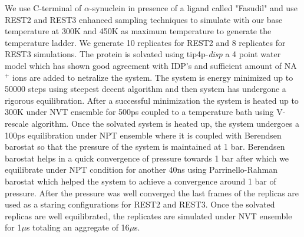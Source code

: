 We use C-terminal of $\alpha$-synuclein in presence of a ligand called "Fasudil" and use REST2 and REST3 enhanced sampling techniques to simulate with our base temperature at 300K 
and 450K as maximum temperature to generate the temperature ladder.
We generate 10 replicates for REST2 and 8 replicates for REST3 simulations.
The protein is solvated using tip4p-\textit{disp} a 4 point water model which has shown good agreement with IDP's and sufficient amount of NA$^{+}$ ions are added to netralize the 
system.
The system is energy minimized up to 50000 steps using steepest decent algorithm and then system has undergone a rigorous equilibration.
After a successful minimization the system is heated up to 300K under NVT ensemble for 500ps coupled to a temperature bath using V-rescale algorithm.
Once the solvated system is heated up, the system undergoes a 100ps equilibration under NPT ensemble where it is coupled with Berendsen barostat so that the pressure of the system 
is maintained at 1 bar.
Berendsen barostat helps in a quick convergence of pressure towards 1 bar after which we equilibrate under NPT condition for another 40ns using Parrinello-Rahman barostat which 
helped the system to achieve a convergence around 1 bar of pressure.
After the pressure was well converged the last frames of the replicas are used as a staring configurations for REST2 and REST3. 
Once the solvated replicas are well equilibrated, the replicates are simulated under NVT ensemble for 1$\mu$s totaling an aggregate of 16$\mu$s.


